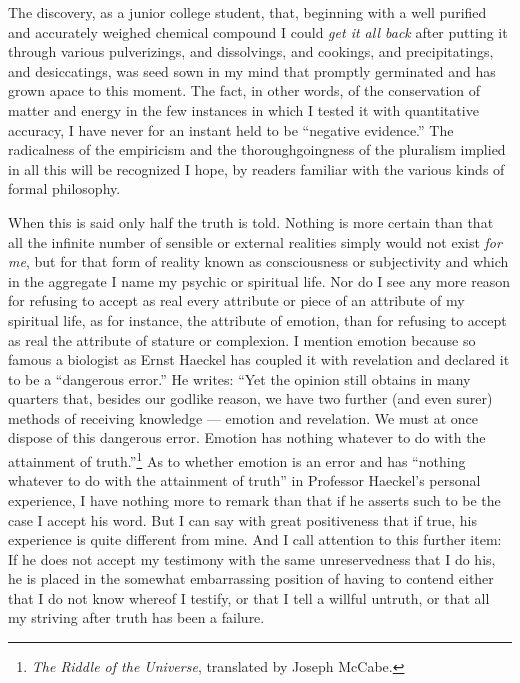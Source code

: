 \documentclass[a4paper, 11pt, oneside, polutonikogreek, english, landscape]{article}
\begin{document}
The discovery, as a junior college student, that, beginning with a well purified and accurately weighed chemical compound I could \emph{get it all back} after putting it through various pulverizings, and dissolvings, and cookings, and precipitatings, and desiccatings, was seed sown in my mind that promptly germinated and has grown apace to this moment. The fact, in other words, of the conservation of matter and energy in the few instances in which I tested it with quantitative accuracy, I have never for an instant held to be ``negative evidence.'' The radicalness of the empiricism and the thoroughgoingness of the pluralism implied in all this will be recognized I hope, by readers familiar with the various kinds of formal philosophy.

When this is said only half the truth is told. Nothing is more certain than that all the infinite number of sensible or external realities simply would not exist \emph{for me}, but for that form of reality known as consciousness or subjectivity and which in the aggregate I name my psychic or spiritual life. Nor do I see any more reason for refusing to accept as real every attribute or piece of an attribute of my spiritual life, as for instance, the attribute of emotion, than for refusing to accept as real the attribute of stature or complexion. I mention emotion because so famous a biologist as Ernst Haeckel has coupled it with revelation and declared it to be a ``dangerous error.'' He writes: ``Yet the opinion still obtains in many quarters that, besides our godlike reason, we have two further (and even surer) methods of receiving knowledge --- emotion and revelation. We must at once dispose of this dangerous error. Emotion has nothing whatever to do with the attainment of truth.''\footnote{\emph{The Riddle of the Universe}, translated by Joseph McCabe.} As to whether emotion is an error and has ``nothing whatever to do with the attainment of truth'' in Professor Haeckel's personal experience, I have nothing more to remark than that if he asserts such to be the case I accept his word. But I can say with great positiveness that if true, his experience is quite different from mine. And I call attention to this further item: If he does not accept my testimony with the same unreservedness that I do his, he is placed in the somewhat embarrassing position of having to contend either that I do not know whereof I testify, or that I tell a willful untruth, or that all my striving after truth has been a failure.
\end{document}
